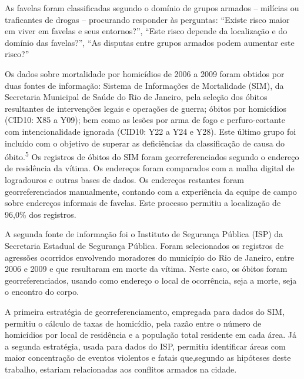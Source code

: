 \documentclass{article}
\begin{document}
As favelas foram classificadas segundo o domínio de grupos armados – milícias ou
traficantes de drogas – procurando responder às perguntas: “Existe risco maior
em viver em favelas e seus entornos?”, “Este risco depende da localização e do
domínio das favelas?”, “As disputas entre grupos armados podem aumentar este
risco?”

Os dados sobre mortalidade por homicídios de 2006 a 2009 foram obtidos por duas
fontes de informação: Sistema de Informações de Mortalidade (SIM), da Secretaria
Municipal de Saúde do Rio de Janeiro, pela seleção dos óbitos resultantes de
intervenções legais e operações de guerra; óbitos por homicídios (CID10: X85 a
Y09); bem como as lesões por arma de fogo e perfuro-cortante com
intencionalidade ignorada (CID10: Y22 a Y24 e Y28). Este último grupo foi
incluído com o objetivo de superar as deficiências da classificação de causa do
óbito.\textsuperscript{5}
Os registros de óbitos do SIM foram georreferenciados segundo o endereço de
residência da vítima. Os endereços foram comparados com a malha digital de
logradouros e outras bases de dados. Os endereços restantes foram
georreferenciados manualmente, contando com a experiência da equipe de campo
sobre endereços informais de favelas. Este processo permitiu a localização de
96,0\% dos registros.

A segunda fonte de informação foi o Instituto de Segurança Pública (ISP) da
Secretaria Estadual de Segurança Pública. Foram selecionados os registros de
agressões ocorridos envolvendo moradores do município do Rio de Janeiro, entre
2006 e 2009 e que resultaram em morte da vítima. Neste caso, os óbitos foram
georreferenciados, usando como endereço o local de ocorrência, seja a morte,
seja o encontro do corpo.

A primeira estratégia de georreferenciamento, empregada para dados do SIM,
permitiu o cálculo de taxas de homicídio, pela razão entre o número de
homicídios por local de residência e a população total residente em cada área.
Já a segunda estratégia, usada para dados do ISP, permitiu identificar áreas com
maior concentração de eventos violentos e fatais que,segundo as hipóteses deste
trabalho, estariam relacionadas aos conflitos armados na cidade.
\end{document}

